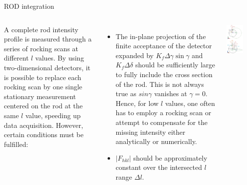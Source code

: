 \begin{frame}{ROD integration}

    \begin{columns}
    

        A complete rod intensity profile is measured through a series of rocking scans at different $l$ values. By using two-dimensional detectors, it is possible to replace each rocking scan by one single stationary measurement centered on the rod at the same $l$ value, speeding up data acquisition. However, certain conditions must be fulfilled:

        \begin{itemize}
            \item The in-plane projection of the finite acceptance of the detector expanded by $K_f\Delta\gamma\sin\gamma$ and $K_f\Delta\delta$ should be sufficiently large to fully include the cross section of the rod. This is not always true as $sin \gamma$ vanishes at $\gamma = 0$. Hence, for low $l$ values, one often has to employ a rocking scan or attempt to compensate for the missing intensity either analytically or numerically.
            \item $|F_{hkl}|$ should be approximately constant over the intersected $l$ range $\Delta l$.
        \end{itemize}
    
        \centering
        \includegraphics[width=0.7\textwidth]{Figures/sxrd_data/rod_integration.png}
    
    \end{columns}

\end{frame}


